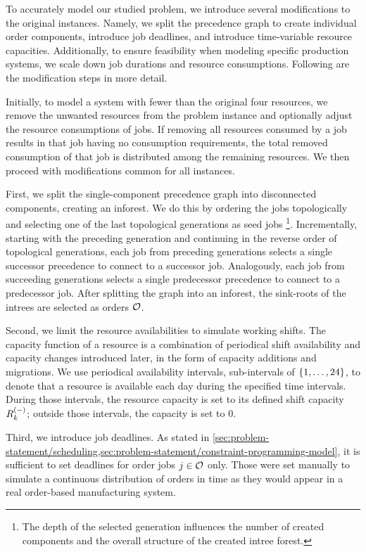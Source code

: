 To accurately model our studied problem, we introduce several modifications to the original instances.
Namely, we split the precedence graph to create individual order components,
introduce job deadlines, and introduce time-variable resource capacities.
Additionally, to ensure feasibility when modeling specific production systems,
we scale down job durations and resource consumptions.
Following are the modification steps in more detail.

Initially, to model a system with fewer than the original four resources,
we remove the unwanted resources from the problem instance
and optionally adjust the resource consumptions of jobs.
If removing all resources consumed by a job results in that job having no consumption requirements,
the total removed consumption of that job is distributed among the remaining resources.
We then proceed with modifications common for all instances.

First, we split the single-component precedence graph into disconnected components,
creating an inforest.
We do this by ordering the jobs topologically
and selecting one of the last topological generations as seed jobs%
\footnote{The depth of the selected generation influences the number of created components
and the overall structure of the created intree forest.}.
Incrementally, starting with the preceding generation
and continuing in the reverse order of topological generations,
each job from preceding generations selects a single successor precedence
to connect to a successor job.
Analogously, each job from succeeding generations selects a single predecessor precedence
to connect to a predecessor job.
After splitting the graph into an inforest,
the sink-roots of the intrees are selected as orders $\mathcal{O}$.

Second, we limit the resource availabilities to simulate working shifts.
The capacity function of a resource is a combination of periodical shift availability
and capacity changes introduced later, in the form of capacity additions and migrations.
We use periodical availability intervals, sub-intervals of $\{{1}, \dots, {24}\}$,
to denote that a resource is available each day during the specified time intervals.
During those intervals, the resource capacity is set to its defined shift capacity $\shiftcapacity{k}$;
outside those intervals, the capacity is set to $0$.

Third, we introduce job deadlines.
As stated in \cref{sec:problem-statement/scheduling,sec:problem-statement/constraint-programming-model},
it is sufficient to set deadlines for order jobs $j \in \mathcal{O}$ only.
Those were set manually to simulate a continuous distribution of orders in time
as they would appear in a real order-based manufacturing system.

